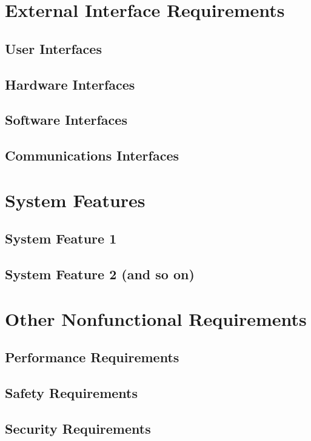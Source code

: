 \documentclass[letterpaper,12pt]{article}
\begin{document}
\pagebreak

\section{\LARGE External Interface Requirements}
\subsection{\Large User Interfaces}
\subsection{\Large Hardware Interfaces}
\subsection{\Large Software Interfaces}
\subsection{\Large Communications Interfaces}

\section{\LARGE System Features}
\subsection{\Large System Feature 1}
\subsection{\Large System Feature 2 (and so on)}

\pagebreak

\section{\LARGE Other Nonfunctional Requirements}
\subsection{\Large Performance Requirements}
\subsection{\Large Safety Requirements}
\subsection{\Large Security Requirements}
\end{document}
